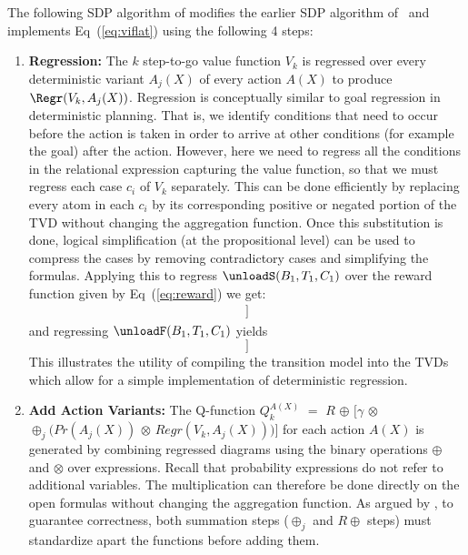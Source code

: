 The following SDP algorithm of \cite{JoshiKeKh11} modifies the earlier
SDP algorithm of~\cite{BoutilierRePr01} and implements Eq~(\ref{eq:viflat}) using
the following 4 steps:
%
%
%
%
%
%
%
%
%
%
%
%
%
%
%
%
%
%
%
%
%
%
%
%
%
%
%
%
\begin{enumerate}
\item \label{sdp_1} {\bf Regression:} The $k$ step-to-go value
  function $V_k$ is regressed over every deterministic variant
  $A_j(X)$ of every action $A(X)$ to produce $\Regr(V_k, A_j(X))$.
%
%
%
%
%
%
%
%
%
%
%
%
%
%
%
%
%
%
%
%
%
%
%
%
%
%
%
%
%
%
%
%
%
%
Regression is conceptually similar to goal regression in
deterministic planning. That is, we identify conditions that need to occur before the action is taken in order to arrive at other conditions (for example the goal) after the action.  
However, here we need to regress all the conditions in the relational expression capturing the value function, so that we must regress 
each case $c_i$
of $V_k$ separately.  This can be done efficiently by replacing every atom in
each $c_i$ by its corresponding positive or negated portion of the TVD without changing the aggregation
function.  
Once this substitution is done, logical simplification (at the
  propositional level) can be used to compress the cases  by
  removing contradictory cases and simplifying the formulas. 
Applying this to regress $\unloadS(B_1,T_1,C_1)$ over the reward function given by Eq~(\ref{eq:reward}) we get:
\begin{align*}
  [\max_B \, [ & (\BIn(B,\paris) \lor \\
      & ((B_1=B)\land (C_1=\paris)  \land \On(B_1,T_1) \land \TIn(T_1,C_1))): 10; \neg: 0]]
\end{align*}
and regressing $\unloadF(B_1,T_1,C_1)$ yields
\begin{equation*}
[\max_B \, [\BIn(B,\paris): 10; \neg: 0]]
\end{equation*}
This illustrates the utility of compiling the transition model into the TVDs which allow for a simple implementation of deterministic regression.
  
\item \label{sdp_2} {\bf Add Action Variants:} The Q-function
  $Q_k^{A(X)}$ $=$ $R$ $\oplus$ $[\gamma$ $\otimes$
  $\oplus_j(Pr(A_j(X))$ $\otimes$ $Regr(V_k, A_j(X)))]$ for each
  action $A(X)$ is generated by combining regressed diagrams using the
  binary operations $\oplus$ and $\otimes$ over expressions.
%
  Recall that probability expressions do not refer to additional
  variables. The multiplication can therefore be done directly on the
  open formulas without changing the aggregation function.  As argued by
  \cite{WangJoKh08}, to guarantee correctness, both summation steps
  ($\oplus_j$ and $R\oplus$ steps) must standardize apart the functions
  before adding them.
  

\end{enumerate}
